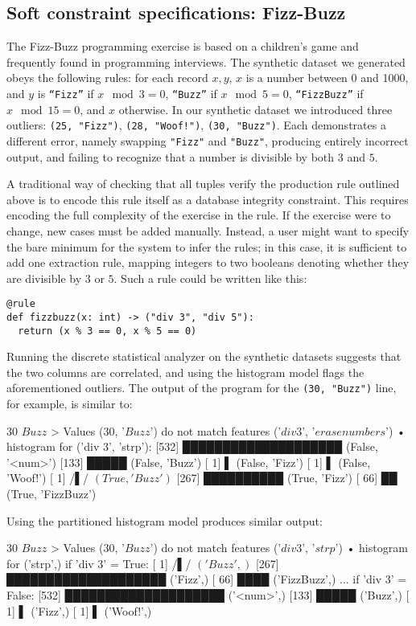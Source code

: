 \subsection{Soft constraint specifications: Fizz-Buzz}
The Fizz-Buzz programming exercise is based on a children's game and frequently found in programming interviews. The synthetic dataset we generated obeys the following rules: for each record \(x, y\), $x$ is a number between 0 and 1000, and $y$ is \texttt{``Fizz''} if \(x \mod 3 = 0\), \texttt{``Buzz''} if \(x \mod 5 = 0\), \texttt{``FizzBuzz''} if \(x \mod 15 = 0\), and \(x\) otherwise. In our synthetic dataset we introduced three outliers: \texttt{(25, "Fizz")}, \texttt{(28, "Woof!")}, \texttt{(30, "Buzz")}. Each demonstrates a different error, namely swapping \texttt{"Fizz"} and \texttt{"Buzz"}, producing entirely incorrect output, and failing to recognize that a number is divisible by both $3$ and $5$.

A traditional way of checking that all tuples verify the production rule outlined above is to encode this rule itself as a database integrity constraint. This requires encoding the full complexity of the exercise in the rule. If the exercise were to change, new cases must be added manually. Instead, a user might want to specify the bare minimum for the system to infer the rules; in this case, it is sufficient to add one extraction rule, mapping integers to two booleans denoting whether they are divisible by $3$ or $5$. Such a rule could be written like this:

\begin{verbatim}
@rule
def fizzbuzz(x: int) -> ("div 3", "div 5"):
  return (x % 3 == 0, x % 5 == 0)
\end{verbatim}

Running the discrete statistical analyzer on the synthetic datasets suggests that the two columns are correlated, and using the histogram model flags the aforementioned outliers. The output of the program for the \texttt{(30, "Buzz")} line, for example, is similar to:

\begin{lstnobreak}[gobble=2]
   $30$ $Buzz$
   > Values ($30$, '$Buzz$') do not
     match features ('$div 3$', '$erase numbers$')
   • histogram for ('div 3', 'strp'):
     [532] ████████████████████ (False, '<num>')
     [133] █████ (False, 'Buzz')
     [  1] ▌ (False, 'Fizz')
     [  1] ▌ (False, 'Woof!')
     [  1] /▌/ $(True, 'Buzz')$
     [267] ██████████ (True, 'Fizz')
     [ 66] ██ (True, 'FizzBuzz')
\end{lstnobreak}

Using the partitioned histogram model produces similar output:

\begin{lstnobreak}[gobble=2]
   $30$ $Buzz$
   > Values ($30$, '$Buzz$') do not
     match features ('$div 3$', '$strp$')
   • histogram for ('strp',) if 'div 3' = True:
     [  1] /▌/ $('Buzz',)$
     [267] ████████████████████ ('Fizz',)
     [ 66] ████ ('FizzBuzz',)
   ... if 'div 3' = False:
     [532] ████████████████████ ('<num>',)
     [133] █████ ('Buzz',)
     [  1] ▌ ('Fizz',)
     [  1] ▌ ('Woof!',)
\end{lstnobreak}
